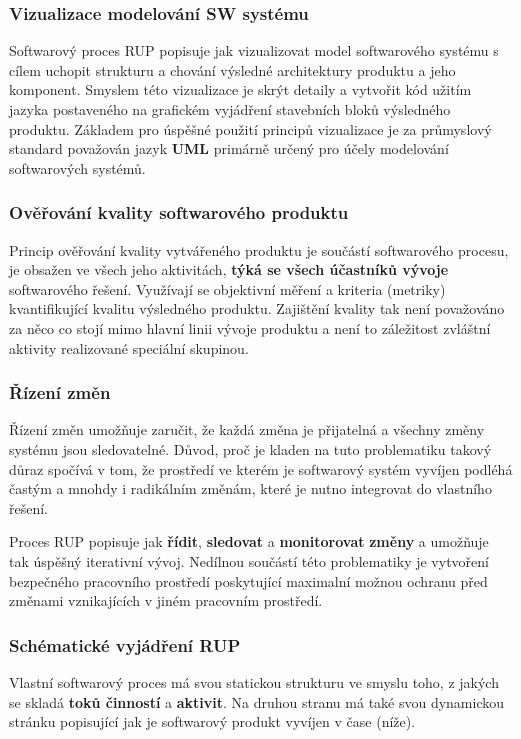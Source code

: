 \subsubsection{Vizualizace modelování SW systému}
Softwarový proces RUP popisuje jak vizualizovat model softwarového systému s cílem uchopit strukturu a chování výsledné architektury produktu a jeho komponent. Smyslem této vizualizace je skrýt detaily a vytvořit kód užitím jazyka postaveného na grafickém vyjádření stavebních bloků výsledného produktu. Základem pro úspěšné použití principů vizualizace je za průmyslový standard považován jazyk \textbf{UML} primárně určený pro účely modelování softwarových systémů.

\subsubsection{Ověřování kvality softwarového produktu}
Princip ověřování kvality vytvářeného produktu je součástí softwarového procesu, je obsažen ve všech jeho aktivitách, \textbf{týká se všech účastníků vývoje} softwarového řešení. Využívají se objektivní měření a kriteria (metriky) kvantifikující kvalitu výsledného produktu. Zajištění kvality tak není považováno za něco co stojí mimo hlavní linii vývoje produktu a není to záležitost zvláštní aktivity realizované speciální skupinou.

\subsubsection{Řízení změn}
Řízení změn umožňuje zaručit, že každá změna je přijatelná a všechny změny systému jsou sledovatelné. 
Důvod, proč je kladen na tuto problematiku takový důraz spočívá v tom, že prostředí ve kterém je softwarový systém  vyvíjen podléhá častým a mnohdy i radikálním změnám, které je nutno integrovat do vlastního řešení. 

Proces RUP popisuje jak \textbf{řídit}, \textbf{sledovat} a \textbf{monitorovat} \textbf{změny} a umožňuje tak úspěšný iterativní vývoj.  Nedílnou součástí této problematiky je vytvoření bezpečného pracovního prostředí poskytující maximalní možnou ochranu před změnami vznikajících v jiném pracovním prostředí.


\subsubsection{Schématické vyjádření RUP}
Vlastní softwarový proces má svou statickou strukturu ve smyslu toho, z jakých se skladá \textbf{toků činností} a \textbf{aktivit}. Na druhou stranu má také svou dynamickou stránku popisující jak je softwarový produkt vyvíjen v čase (níže).

